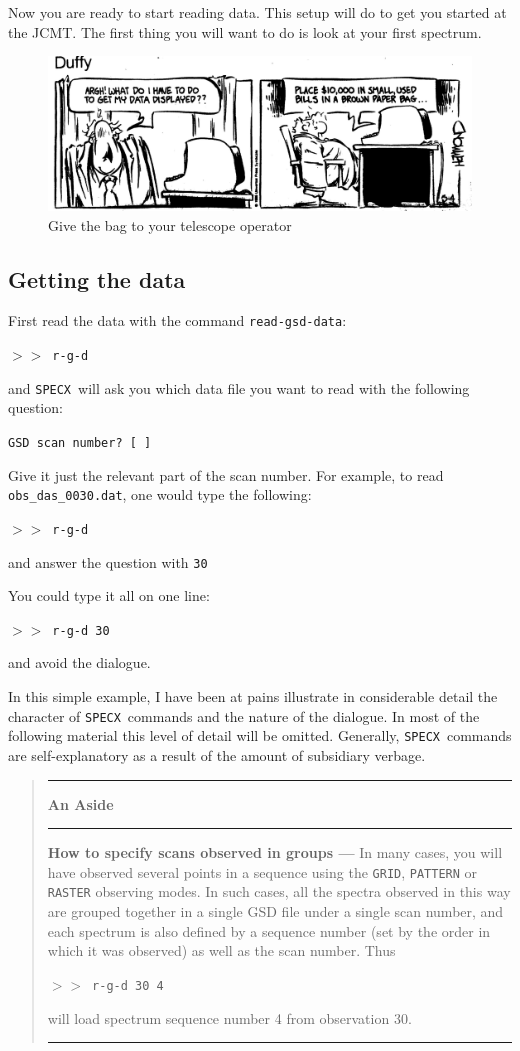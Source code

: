\documentclass[11pt,twoside]{starlink}
\providecommand{\SPECX}{\texttt{SPECX}}
\providecommand{\SP}{{$>\!>$}}
\newenvironment{aside}{
\begin{quote}\begin{center}\rule[1mm]{1.0in}{0.015in}\hspace*{2mm}
\textbf{An Aside}
\hspace*{2mm}\rule[1mm]{1.0in}{0.015in}\end{center}
}{
\myline
\end{quote}
}
\providecommand{\myline}
{\vspace*{-0.2in}\begin{center}\rule{3.0in}{0.015in}\end{center}}
\begin{document}
Now you are ready to start reading data. This setup will do to get you
started at the JCMT. The first thing you will want to do is look at
your first spectrum.

\begin{figure}[htb]
\centering
\includegraphics[width=\textwidth]{sc8_duffy}
\caption[Getting plots out]
{\small{Give the bag to your telescope operator}}
\label{fig:duffy}
\end{figure}

\subsection{Getting the data}
\label{sec:getting-the-data}
First read the data with the command \texttt{read-gsd-data}:

\SP\ \texttt{r-g-d}

and \SPECX\ will ask you which data file you want to read with the
following question:

\texttt{GSD scan number? [ ]}

Give it just the relevant part of the scan number.  For example, to
read \texttt{obs\_das\_0030.dat}, one would type the following:

\SP\ \texttt{r-g-d}

and answer the question with \texttt{30}

You could type it all on one line:

\SP\ \texttt{r-g-d 30}

and avoid the dialogue.

In this simple example, I have been at pains illustrate in
considerable detail the character of \SPECX\ commands and the nature
of the dialogue. In most of the following material this level of
detail will be omitted. Generally, \SPECX\ commands are
self-explanatory as a result of the amount of subsidiary verbage.

\begin{aside}
\textbf{How to specify scans observed in groups --- } In many cases, you
will have observed several points in a sequence using the \texttt{GRID},
\texttt{PATTERN} or \texttt{RASTER} observing modes. In such cases, all the
spectra observed in this way are grouped together in a single GSD file
under a single scan number, and each spectrum is also defined by a
sequence number (set by the order in which it was observed) as well as
the scan number.  Thus

\SP\ \texttt{r-g-d 30 4}

will load spectrum sequence number 4 from observation 30.
\end{aside}
\end{document}
